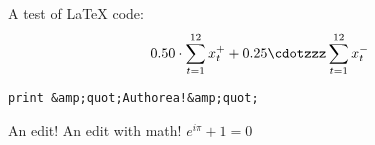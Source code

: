 A test of LaTeX code: \[ 0.50 \cdot \sum_{t = 1}^{12} x_t^+ + 0.25 \cdotzzz \sum_{t = 1}^{12} x_t^- \]

\verb|print &amp;quot;Authorea!&amp;quot;|

An edit! An edit with math! $e^{i\pi} + 1 = 0$



